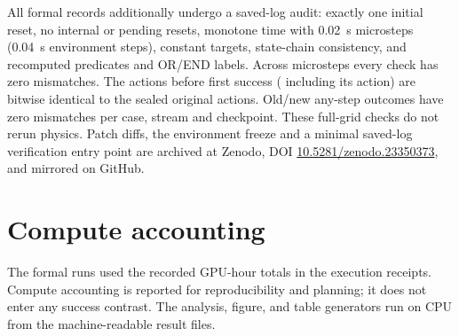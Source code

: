\documentclass[manuscript,screen,review]{jair}
\begin{document}
All \RfourFormalCount{} formal records additionally undergo a saved-log audit: exactly one initial reset, no internal or pending resets, monotone time with 0.02~s microsteps (0.04~s environment steps), constant targets, state-chain consistency, and recomputed predicates and OR/END labels. Across \RfourMicroCount{} microsteps every check has zero mismatches. The \RfourPrefixCount{} actions before first success (\RfourPrefixHitCount{} including its action) are bitwise identical to the sealed original actions. Old/new any-step outcomes have zero mismatches per case, stream and checkpoint. These full-grid checks do not rerun physics. Patch diffs, the environment freeze and a minimal saved-log verification entry point are archived at Zenodo, DOI \href{https://doi.org/10.5281/zenodo.23350373}{10.5281/zenodo.23350373}, and mirrored on GitHub.






\FloatBarrier
\section{Compute accounting}
The formal runs used the recorded GPU-hour totals in the execution receipts. Compute accounting is reported for reproducibility and planning; it does not enter any success contrast. The analysis, figure, and table generators run on CPU from the machine-readable result files.


\FloatBarrier
\printbibliography
\end{document}

